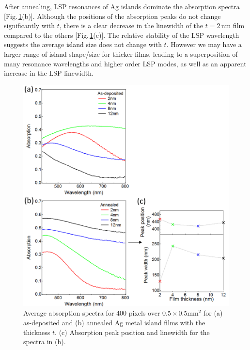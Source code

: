 After annealing, LSP resonances of Ag islands dominate the absorption spectra [Fig.\,\ref{6Fig6}(b)]. Although the positions of the absorption peaks do not change significantly with $t$, there is a clear decrease in the linewidth of the $t=2$\,nm film compared to the others [Fig.\,\ref{6Fig6}(c)]. The relative stability of the LSP wavelength suggests the average island size does not change with $t$. However we may have a larger range of island shape/size for thicker films, leading to a superposition of many resonance wavelengths and higher order LSP modes, as well as an apparent increase in the LSP linewidth.
\begin{figure}[h!] 
\centering    
\includegraphics[width=\textwidth]{Fig6}
\caption{Average absorption spectra for 400 pixels over $0.5\times0.5$mm$^2$ for (a) as-deposited and (b) annealed Ag metal island films with the thickness $t$. (c) Absorption peak position and linewidth for the spectra in (b).}
\label{6Fig6}
\end{figure}

